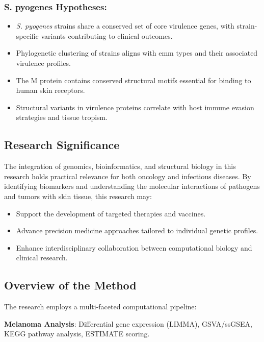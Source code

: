 \documentclass[
]{article}
\begin{document}
\subsubsection{S. pyogenes Hypotheses:}\label{s.-pyogenes-hypotheses}

\begin{itemize}
\item
  \emph{S. pyogenes} strains share a conserved set of core virulence
  genes, with strain-specific variants contributing to clinical
  outcomes.
\item
  Phylogenetic clustering of strains aligns with emm types and their
  associated virulence profiles.
\item
  The M protein contains conserved structural motifs essential for
  binding to human skin receptors.
\item
  Structural variants in virulence proteins correlate with host immune
  evasion strategies and tissue tropism.
\end{itemize}

\subsection{Research Significance}\label{research-significance}

The integration of genomics, bioinformatics, and structural biology in
this research holds practical relevance for both oncology and infectious
diseases. By identifying biomarkers and understanding the molecular
interactions of pathogens and tumors with skin tissue, this research
may:

\begin{itemize}
\item
  Support the development of targeted therapies and vaccines.
\item
  Advance precision medicine approaches tailored to individual genetic
  profiles.
\item
  Enhance interdisciplinary collaboration between computational biology
  and clinical research.
\end{itemize}

\subsection{Overview of the Method}\label{overview-of-the-method}

The research employs a multi-faceted computational pipeline:

\textbf{Melanoma Analysis}: Differential gene expression (LIMMA),
GSVA/ssGSEA, KEGG pathway analysis, ESTIMATE scoring.
\end{document}
